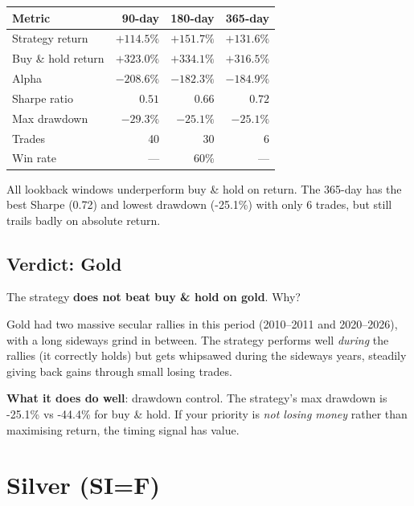 \documentclass[11pt,a4paper]{article}
\begin{document}
\vspace{0.5em}
\begin{tabular}{@{}lrrr@{}}
    \toprule
    \textbf{Metric} & \textbf{90-day} & \textbf{180-day} & \textbf{365-day} \\
    \midrule
    Strategy return    & $+114.5\%$ & $+151.7\%$ & $+131.6\%$ \\
    Buy \& hold return & $+323.0\%$ & $+334.1\%$ & $+316.5\%$ \\
    Alpha              & $-208.6\%$ & $-182.3\%$ & $-184.9\%$ \\
    Sharpe ratio       & $0.51$     & $0.66$     & $0.72$     \\
    Max drawdown       & $-29.3\%$  & $-25.1\%$  & $-25.1\%$  \\
    Trades             & 40         & 30         & 6          \\
    Win rate           & ---        & 60\%       & ---        \\
    \bottomrule
\end{tabular}

\vspace{0.5em}
All lookback windows underperform buy \& hold on return. The 365-day
has the best Sharpe (0.72) and lowest drawdown (-25.1\%) with only 6
trades, but still trails badly on absolute return.

\subsection{Verdict: Gold}

The strategy \textbf{does not beat buy \& hold on gold}. Why?

Gold had two massive secular rallies in this period (2010--2011 and
2020--2026), with a long sideways grind in between. The strategy
performs well \emph{during} the rallies (it correctly holds) but
gets whipsawed during the sideways years, steadily giving back
gains through small losing trades.

\textbf{What it does do well}: drawdown control. The strategy's max
drawdown is -25.1\% vs -44.4\% for buy \& hold. If your priority is
\emph{not losing money} rather than maximising return, the timing
signal has value.


\section{Silver (SI=F)}
\end{document}
